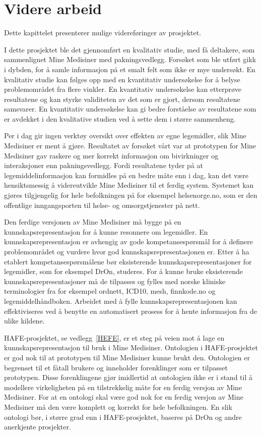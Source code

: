 \chapter{Videre arbeid} \label{chap:videreArbeid}

Dette kapittelet presenterer mulige videreføringer av prosjektet.

I dette prosjektet ble det gjennomført en kvalitativ studie, med få deltakere, som sammenlignet Mine Medisiner med pakningsvedlegg. Forsøket som ble utført gikk i dybden, for å samle informasjon på et smalt felt som ikke er mye undersøkt. En kvalitativ studie kan følges opp med en kvantitativ undersøkelse for å belyse problemområdet fra flere vinkler. En kvantitativ undersøkelse kan etterprøve resultatene og kan styrke validiteten av det som er gjort, dersom resultatene samsvarer. En kvantitativ undersøkelse kan gi bedre forståelse av resultatene som er avdekket i den kvalitative studien ved å sette dem i større sammenheng.

Per i dag gir ingen verktøy oversikt over effekten av egne legemidler, slik Mine Medisiner er ment å gjøre. Resultatet av forsøket vårt var at prototypen for Mine Medisiner gav raskere og mer korrekt informasjon om bivirkninger og interaksjoner enn pakningsvedlegg. Fordi resultatene tyder på at legemiddelinformasjon kan formidles på en bedre måte enn i dag, kan det være hensiktsmessig å videreutvikle Mine Medisiner til et ferdig system. Systemet kan gjøres tilgjengelig for hele befolkningen på for eksempel helsenorge.no, som er den offentlige inngangsporten til helse- og omsorgstjenester på nett. 

Den ferdige versjonen av Mine Medisiner må bygge på en kunnskapsrepresentasjon for å kunne resonnere om legemidler. En kunnskapsrepresentasjon er avhengig av gode kompetansespørsmål for å definere problemområdet og vurdere hvor god kunnskapsrepresentasjonen er. Etter å ha etablert kompetansespørsmålene bør eksisterende kunnskapsrepresentasjoner for legemidler, som for eksempel DrOn, studeres. For å kunne bruke eksisterende kunnskapsrepresentasjoner må de tilpasses og fylles med norske kliniske terminologier fra for eksempel ordnett, ICD10, \acrshort{mesh}, finnkode.no og legemiddelhåndboken. Arbeidet med å fylle kunnskapsrepresentasjonen kan effektiviseres ved å benytte en automatisert prosess for å hente informasjon fra de ulike kildene. 

HAFE-prosjektet, se vedlegg~\ref{HEFE}, er et steg på veien mot å lage en kunnskapsrepresentasjon til bruk i Mine Medisiner. Ontologien i HAFE-prosjektet er god nok til at prototypen til Mine Medisiner kunne brukt den. Ontologien er begrenset til et fåtall brukere og inneholder forenklinger som er tilpasset prototypen. Disse forenklingene gjør imidlertid at ontologien ikke er i stand til å modellere virkeligheten på en tilstrekkelig måte for en ferdig versjon av Mine Medisiner. For at en ontologi skal være god nok for en ferdig versjon av Mine Medisiner må den være komplett og korrekt for hele befolkningen. En slik ontologi bør, i større grad enn i HAFE-prosjektet, baseres på DrOn og andre anerkjente prosjekter. 

